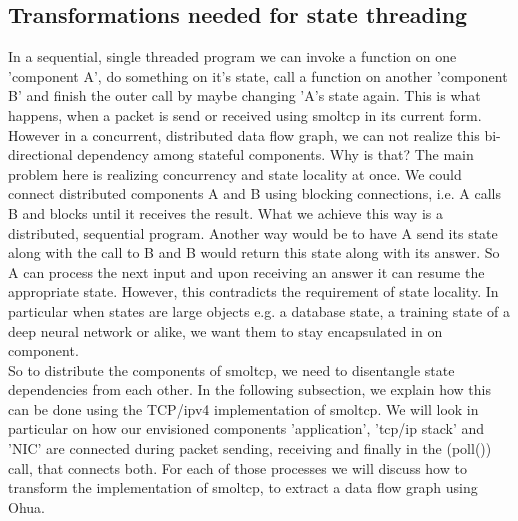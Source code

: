 \subsection{Transformations needed for state threading}
\label{subsec:StateThreading}

In a sequential, single threaded program we can invoke a function on one 'component A', do something on it's state, call a function on another 'component B' and finish the outer call by maybe changing 'A's state again. This is what happens, when a packet is send or received using smoltcp in its current form. However in a concurrent, distributed data flow graph, we can not realize this bi-directional dependency among stateful components. Why is that? The main problem here is realizing concurrency and state locality at once. We could connect distributed components A and B using blocking connections, i.e. A calls B and blocks until it receives the result. What we achieve this way is a distributed, sequential program. Another way would be to have A send its state along with the call to B and B would return this state along with its answer. So A can process the next input and upon receiving an answer it can resume the appropriate state. However, this contradicts the requirement of state locality. In particular when states are large objects e.g. a database state, a training state of a deep neural network or alike, we want them to stay encapsulated in on component.\\

So to distribute the components of smoltcp, we need to disentangle state dependencies from each other. In the following subsection, we explain how this can be done using the TCP/ipv4 implementation of smoltcp. We will look in particular on how our envisioned components 'application', 'tcp/ip stack' and 'NIC' are connected during packet sending, receiving and finally in the \rust(poll()) call, that connects both. For each of those processes we will discuss how to transform the implementation of smoltcp, to extract a data flow graph using Ohua. 


